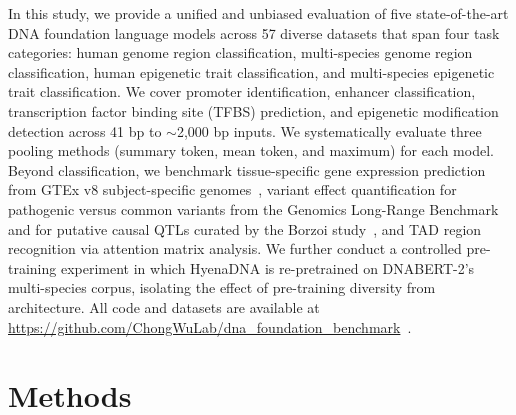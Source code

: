 \documentclass[11pt,a4paper]{article}
\begin{document}
In this study, we provide a unified and unbiased evaluation of five state-of-the-art DNA foundation language models across 57 diverse datasets that span four task categories: human genome region classification, multi-species genome region classification, human epigenetic trait classification, and multi-species epigenetic trait classification. We cover promoter identification, enhancer classification, transcription factor binding site (TFBS) prediction, and epigenetic modification detection across 41 bp to $\sim$2{,}000 bp inputs. We systematically evaluate three pooling methods (summary token, mean token, and maximum) for each model. Beyond classification, we benchmark tissue-specific gene expression prediction from GTEx v8 subject-specific genomes~\citep{gtex2020v8}, variant effect quantification for pathogenic versus common variants from the Genomics Long-Range Benchmark~\citep{trop2024longrange} and for putative causal QTLs curated by the Borzoi study~\citep{linder2025borzoi}, and TAD region recognition via attention matrix analysis. We further conduct a controlled pre-training experiment in which HyenaDNA is re-pretrained on DNABERT-2's multi-species corpus, isolating the effect of pre-training diversity from architecture. All code and datasets are available at \url{https://github.com/ChongWuLab/dna_foundation_benchmark}~\citep{feng2024zenodo}.

\section{Methods}
\end{document}
